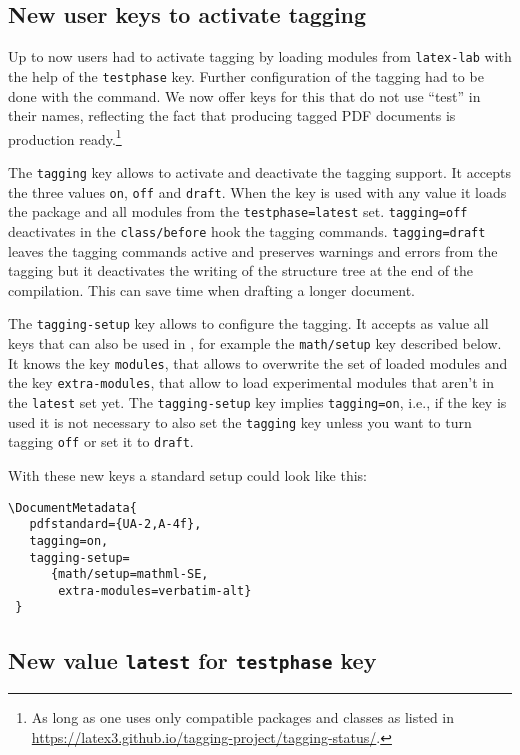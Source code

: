 \documentclass{ltnews}
\begin{document}
\subsection{New user keys to activate tagging}

Up to now users had to activate tagging by loading modules from \texttt{latex-lab} with
the help of the \texttt{testphase} key. Further configuration of the tagging had to be done
with the  command. 
We now offer keys for this that do not use \enquote{test} in their names, reflecting the fact that producing tagged PDF documents is production ready.\footnote{As long as one uses only compatible packages and classes as listed in \url{https://latex3.github.io/tagging-project/tagging-status/}.}

The \texttt{tagging} key allows to activate and deactivate the tagging support.
It accepts the three values \texttt{on}, \texttt{off} and \texttt{draft}. 
When the key is used with any value it loads the  package and all modules from the \texttt{testphase=latest}
set. \texttt{tagging=off} deactivates in the \texttt{class/before} hook the tagging commands. \texttt{tagging=draft} leaves the
tagging commands active and preserves warnings and errors from the tagging but it deactivates the writing of the structure tree 
at the end of the compilation. This can save time when drafting a longer document.

The \texttt{tagging-setup} key allows to configure the tagging.  It accepts as value all 
keys that can also be used in , for example the \texttt{math/setup}
key described below. It knows the key \texttt{modules}, that allows to overwrite the set of loaded modules and the key  \texttt{extra-modules}, that allow to load experimental modules that aren't in the \texttt{latest} set yet.
%
The \texttt{tagging-setup} key implies \texttt{tagging=on}, i.e., if
the key is used it is not necessary to also set the \texttt{tagging}
key unless you want to turn tagging \texttt{off} or set it to
\texttt{draft}.

With these new keys a standard setup could look like this:
\begin{verbatim}
\DocumentMetadata{
   pdfstandard={UA-2,A-4f},
   tagging=on,
   tagging-setup=
      {math/setup=mathml-SE,
       extra-modules=verbatim-alt}
 }      
\end{verbatim}


\subsection{New value \texttt{latest} for \texttt{testphase} key}
\end{document}
